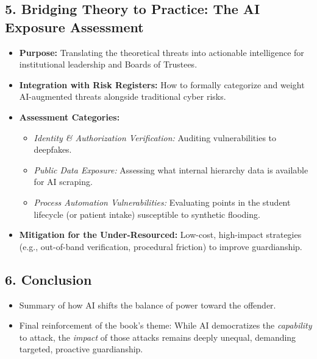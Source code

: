 \documentclass[11pt, a4paper]{article}
\begin{document}
\subsection{5. Bridging Theory to Practice: The AI Exposure Assessment}
\begin{itemize}
    \item \textbf{Purpose:} Translating the theoretical threats into actionable intelligence for institutional leadership and Boards of Trustees.
    \item \textbf{Integration with Risk Registers:} How to formally categorize and weight AI-augmented threats alongside traditional cyber risks.
    \item \textbf{Assessment Categories:}
    \begin{itemize}
        \item \textit{Identity \& Authorization Verification:} Auditing vulnerabilities to deepfakes.
        \item \textit{Public Data Exposure:} Assessing what internal hierarchy data is available for AI scraping.
        \item \textit{Process Automation Vulnerabilities:} Evaluating points in the student lifecycle (or patient intake) susceptible to synthetic flooding.
    \end{itemize}
    \item \textbf{Mitigation for the Under-Resourced:} Low-cost, high-impact strategies (e.g., out-of-band verification, procedural friction) to improve guardianship.
\end{itemize}

\subsection{6. Conclusion}
\begin{itemize}
    \item Summary of how AI shifts the balance of power toward the offender.
    \item Final reinforcement of the book's theme: While AI democratizes the \textit{capability} to attack, the \textit{impact} of those attacks remains deeply unequal, demanding targeted, proactive guardianship.
\end{itemize}
\end{document}
